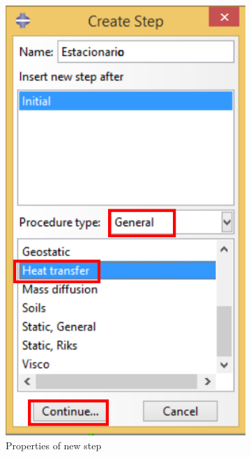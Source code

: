 \begin{figure}[!h]
\begin{subfigure}[!h]{0.39\textwidth}
      \includegraphics[width=\textwidth]{./body/images/step02.pdf}
      \caption{Properties of new step}
      \label{step02}
    \end{subfigure}%
    ~ %
    \begin{subfigure}[!h]{0.39\textwidth}

\end{subfigure}
\end{figure}
